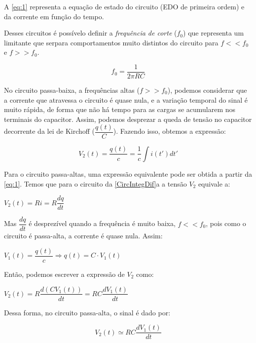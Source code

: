 \documentclass[11pt,a4paper]{article}
\begin{document}
    A \cref{eq:1} representa a equação de estado do circuito (EDO de primeira ordem) e da corrente em função do tempo.
    
    Desses circuitos é possívelo definir a \textit{frequência de corte} ($f_0$) que representa um limitante que serpara comportamentos muito distintos do circuito para $f << f_0$ e $f >> f_0$.
    
    \begin{equation}
        f_0 = \dfrac{1}{2 \pi RC}
    \label{f0}
    \end{equation}
    
    
    No circuito passa-baixa, a frequências altas ($f >> f_0$), podemos considerar que a corrente que atravessa o circuito é quase nula, e  a variação temporal do sinal é muito rápida, de forma que não há tempo para as cargas se acumularem nos terminais do capacitor. Assim, podemos desprezar a queda de tensão no capacitor decorrente da lei de Kirchoff ($\dfrac {q\left( t\right) }{C}$). Fazendo isso, obtemos a expressão:
    
    \begin{equation}
        V_{2}\left( t\right) =\dfrac {q\left( t\right) }{c}=\dfrac {1}{c}\int i\left( t'\right) dt'
    \label{eq:2}
    \end{equation}
    
    
    Para o circuito passa-altas, uma expressão equivalente pode ser obtida a partir da \cref{eq:1}. Temos que para o circuito da \cref{CircIntegDif}a a tensão $V_2$ equivale a:
    
    $V_{2}\left(t\right)=Ri=R\dfrac{dq}{dt}$
    
    Mas $\dfrac{dq}{dt}$ é desprezível quando a frequência é muito baixa, $f<<f_0$, pois como o circuito é passa-alta, a corrente é quase nula. Assim:
    
    $V_{1}\left( t\right) =\dfrac {q\left( t\right) }{c}\Rightarrow q\left( t\right) =C\cdot V_{1}\left( t\right)$
    
    Então, podemos escrever a expressão de $V_2$ como:
    
    $V_{2}\left( t\right) =R\dfrac {d\left( CV_{1}\left( t\right) \right) }{dt}=RC\dfrac {dV_{1}\left( t\right) }{dt}$
    
    Dessa forma, no circuito passa-alta, o sinal é dado por:
    
    \begin{equation}
        V_{2}\left( t\right) \simeq RC\dfrac {dV_{1}\left( t\right) }{dt}
    \label{eq:3}
    \end{equation}
    
\end{document}
